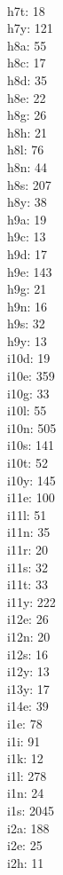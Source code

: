 \begin{multicols}{8}
  \\h7t: 18
  \\h7y: 121
  \\h8a: 55
  \\h8c: 17
  \\h8d: 35
  \\h8e: 22
  \\h8g: 26
  \\h8h: 21
  \\h8l: 76
  \\h8n: 44
  \\h8s: 207
  \\h8y: 38
  \\h9a: 19
  \\h9c: 13
  \\h9d: 17
  \\h9e: 143
  \\h9g: 21
  \\h9n: 16
  \\h9s: 32
  \\h9y: 13
  \\i10d: 19
  \\i10e: 359
  \\i10g: 33
  \\i10l: 55
  \\i10n: 505
  \\i10s: 141
  \\i10t: 52
  \\i10y: 145
  \\i11e: 100
  \\i11l: 51
  \\i11n: 35
  \\i11r: 20
  \\i11s: 32
  \\i11t: 33
  \\i11y: 222
  \\i12e: 26
  \\i12n: 20
  \\i12s: 16
  \\i12y: 13
  \\i13y: 17
  \\i14e: 39
  \\i1e: 78
  \\i1i: 91
  \\i1k: 12
  \\i1l: 278
  \\i1n: 24
  \\i1s: 2045
  \\i2a: 188
  \\i2e: 25
  \\i2h: 11

\end{multicols}
